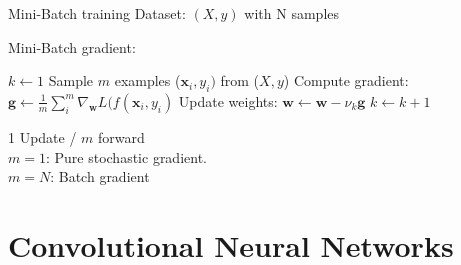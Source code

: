 \documentclass[handout, 10pt]{beamer}
\begin{document}
\begin{frame}{Mini-Batch training}
Dataset: $(X,y)$ with N samples
\begin{footnotesize}
\begin{block}{Mini-Batch gradient:}\end{block}

    \begin{algorithmic}
    \State $k \leftarrow 1$
    \State Sample $m$ examples ($\mathbf{x}_i,y_i)$ from ($X,y$)
    \State Compute gradient: $\mathbf{g} \leftarrow \frac{1}{m}\sum_i^m\nabla_\mathbf{w}L(f(\mathbf{x}_i,y_i)$
    \State Update weights: $\mathbf{w} \leftarrow \mathbf{w} - \nu_k\mathbf{g}$
    \State $k \leftarrow k + 1$
    \EndWhile 
    
    \end{algorithmic}
    \end{footnotesize}
    \pause
        \alert{1 Update / $m$ forward}\\
        $m=1$: Pure stochastic gradient.\\
        $m=N$: Batch gradient

\end{frame}

\section{Convolutional Neural Networks}
\end{document}

